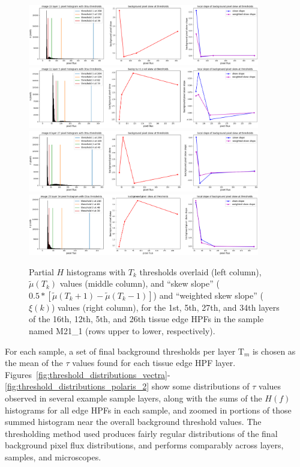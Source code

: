 \documentclass[letterpaper,11pt]{article}
\newcommand{\Tau}{\mathrm{T}}
\begin{document}
\begin{figure}[!hb]
\centering
\includegraphics[width=0.9\textwidth]{images/masking/thresholds_image_15_layer_1}
\includegraphics[width=0.9\textwidth]{images/masking/thresholds_image_11_layer_5}
\includegraphics[width=0.9\textwidth]{images/masking/thresholds_image_4_layer_27}
\includegraphics[width=0.9\textwidth]{images/masking/thresholds_image_25_layer_34}
\caption{\footnotesize Partial $H$ histograms with $T_{k}$ thresholds overlaid (left column), $\widetilde{\mu}(T_{k})$ values (middle column), and ``skew slope'' ($0.5*\left[\widetilde{\mu}(T_{k}+1) - \widetilde{\mu}(T_{k}-1)\right]$) and ``weighted skew slope'' ($\xi(k)$) values (right column), for the 1st, 5th, 27th, and 34th layers of the 16th, 12th, 5th, and 26th tissue edge HPFs in the sample named M21\_1 (rows upper to lower, respectively).}
\label{fig:histograms_with_otsu_thresholds}
\end{figure}

For each sample, a set of final background thresholds per layer $\Tau_{m}$ is chosen as the mean of the $\tau$ values found for each tissue edge HPF layer. Figures~\ref{fig:threshold_distributions_vectra}-\ref{fig:threshold_distributions_polaris_2} show some distributions of $\tau$ values observed in several example sample layers, along with the sums of the $H(f)$ histograms for all edge HPFs in each sample, and zoomed in portions of those summed histogram near the overall background threshold values. The thresholding method used produces fairly regular distributions of the final background pixel flux distributions, and performs comparably across layers, samples, and microscopes. 
\end{document}
